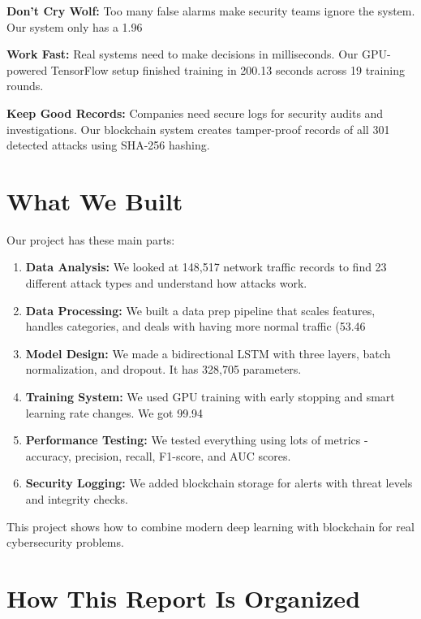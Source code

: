 \documentclass[12pt,a4paper]{report}
\begin{document}
\textbf{Don't Cry Wolf:} Too many false alarms make security teams ignore the system. Our system only has a 1.96%

\textbf{Work Fast:} Real systems need to make decisions in milliseconds. Our GPU-powered TensorFlow setup finished training in 200.13 seconds across 19 training rounds.

\textbf{Keep Good Records:} Companies need secure logs for security audits and investigations. Our blockchain system creates tamper-proof records of all 301 detected attacks using SHA-256 hashing.

\section{What We Built}

Our project has these main parts:

\begin{enumerate}[leftmargin=*]
    \item \textbf{Data Analysis:} We looked at 148,517 network traffic records to find 23 different attack types and understand how attacks work.
    \item \textbf{Data Processing:} We built a data prep pipeline that scales features, handles categories, and deals with having more normal traffic (53.46%
    \item \textbf{Model Design:} We made a bidirectional LSTM with three layers, batch normalization, and dropout. It has 328,705 parameters.
    \item \textbf{Training System:} We used GPU training with early stopping and smart learning rate changes. We got 99.94%
    \item \textbf{Performance Testing:} We tested everything using lots of metrics - accuracy, precision, recall, F1-score, and AUC scores.
    \item \textbf{Security Logging:} We added blockchain storage for alerts with threat levels and integrity checks.
\end{enumerate}

This project shows how to combine modern deep learning with blockchain for real cybersecurity problems.

\section{How This Report Is Organized}
\end{document}
